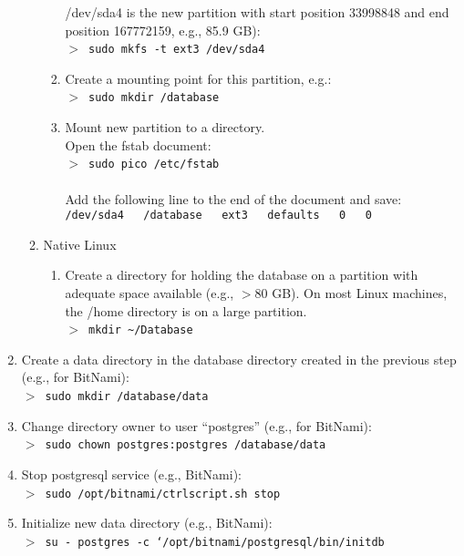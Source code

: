 \begin{enumerate}
\begin{enumerate}
\begin{enumerate}
                   /dev/sda4 is the new partition with start position 33998848 
                   and end position 167772159, e.g., 85.9 GB):\\
                   $>$~\texttt{sudo mkfs -t ext3 /dev/sda4}
             \item Create a mounting point for this partition, e.g.:\\
                   $>$~\texttt{sudo mkdir /database}
             \item Mount new partition to a directory.\\
             		Open the fstab document:\\
                   $>$~\texttt{sudo pico /etc/fstab}\\
                   \\
                   Add the following line to the end of the document and save:\\
                   \texttt{/dev/sda4~~~/database~~~ext3~~~defaults~~~0~~~0}
    	\end{enumerate}
        \item Native Linux
        \begin{enumerate}
            \item Create a directory for holding the database on a partition 
                  with adequate space available (e.g., $>$80 GB).  On most Linux 
                  machines, the /home directory is on a large partition. \\
                  $>$~\texttt{mkdir \textasciitilde /Database}
        \end{enumerate}
    \end{enumerate}
    \item Create a data directory in the database directory created in the 
         previous step (e.g., for BitNami):\\
         $>$~\texttt{sudo mkdir /database/data}
   \item Change directory owner to user ``postgres'' (e.g., for BitNami):\\
         $>$~\texttt{sudo chown postgres:postgres /database/data}
   \item Stop postgresql service (e.g., BitNami):\\
         $>$~\texttt{sudo /opt/bitnami/ctrlscript.sh stop}
   \item Initialize new data directory (e.g., BitNami):\\
         $>$~\texttt{su - postgres -c `/opt/bitnami/postgresql/bin/initdb \\
}
\end{enumerate}
